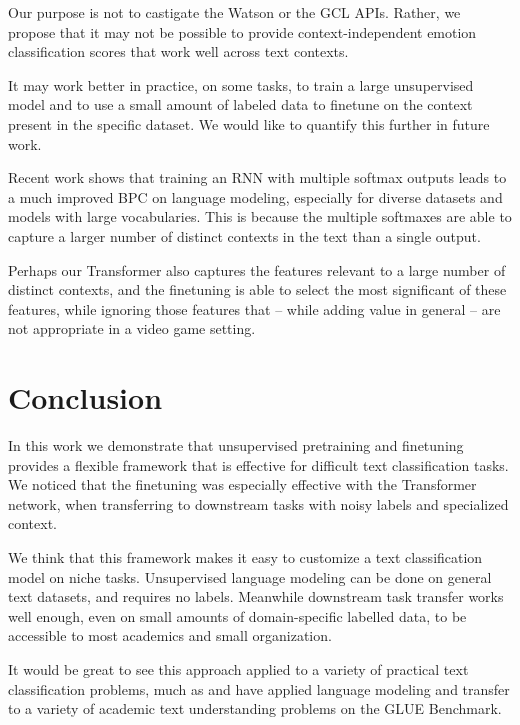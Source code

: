 \documentclass[letterpaper]{article} %
\begin{document}
Our purpose is not to castigate the Watson or the GCL APIs. Rather, we propose that it may not be possible to provide context-independent emotion classification scores that work well across text contexts. 

It may work better in practice, on some tasks, to train a large unsupervised model and to use a small amount of labeled data to finetune on the context present in the specific dataset. We would like to quantify this further in future work. 

Recent work \cite{SoftmaxBottleneck2017} shows that training an RNN with multiple softmax outputs leads to a much improved BPC on language modeling, especially for diverse datasets and models with large vocabularies. This is because the multiple softmaxes are able to capture a larger number of distinct contexts in the text than a single output. 

Perhaps our Transformer also captures the features relevant to a large number of distinct contexts, and the finetuning is able to select the most significant of these features, while ignoring those features that -- while adding value in general -- are not appropriate in a video game setting. 


\section{Conclusion}
In this work we demonstrate that unsupervised pretraining and finetuning provides a flexible framework that is effective for difficult text classification tasks. 
We noticed that the finetuning was especially effective with the Transformer network, when transferring to downstream tasks with noisy labels and specialized context.

We think that this framework makes it easy to customize a text classification model on niche tasks. Unsupervised language modeling can be done on general text datasets, and requires no labels. Meanwhile downstream task transfer works well enough, even on small amounts of domain-specific labelled data, to be accessible to most academics and small organization. 

It would be great to see this approach applied to a variety of practical text classification problems, much as \cite{Radford2018} and \cite{devlin2018bert} have applied language modeling and transfer to a variety of academic text understanding problems on the GLUE Benchmark. 





\end{document}
